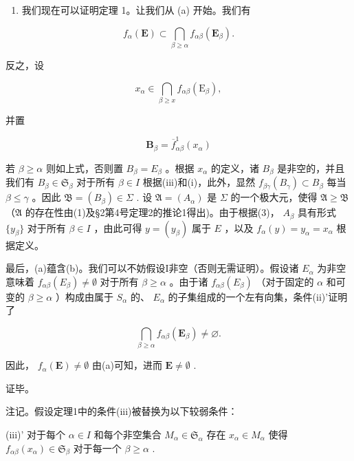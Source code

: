 \begin{enumerate}
\def\labelenumi{(\arabic{enumi})}
\setcounter{enumi}{3}
\tightlist
\item
  我们现在可以证明定理 1。让我们从 (a) 开始。我们有
\end{enumerate}

\[
f _ {\alpha} (\mathbf {E}) \subset \bigcap_ {\beta \geqslant \alpha} f _ {\alpha \beta} (\mathbf {E} _ {\beta}).
\]

反之，设

\[
x _ {\alpha} \in \bigcap_ {\beta \geqslant x} f _ {\alpha \beta} (\mathrm{E} _ {\beta}),
\]

并置

\[
\mathbf {B} _ {\beta} = \overline {{f}} _ {\alpha \beta} ^ {1} (x _ {\alpha})
\]

若 \(\beta \geqslant \alpha\) 则如上式，否则置 \(B_{\beta} = E_{\beta}\) 。根据 \(x_{\alpha}\) 的定义，诸 \(B_{\beta}\) 是非空的，并且我们有 \(B_{\beta} \in \mathfrak{S}_{\beta}\) 对于所有 \(\beta \in I\) 根据(iii)和(i)，此外，显然 \(f_{\beta \gamma}(B_{\gamma}) \subset B_{\beta}\) 每当 \(\beta \leqslant \gamma\) 。因此 \(\mathfrak{B} = (B_{\beta}) \in \Sigma\) . 设 \(\mathfrak{A} = (A_{\alpha})\) 是 \(\Sigma\) 的一个极大元，使得 \(\mathfrak{A} \geqslant \mathfrak{B}\) （\(\mathfrak{A}\) 的存在性由(1)及§2第4号定理2的推论1得出)。由于根据(3)， \(A_{\beta}\) 具有形式 \(\{y_{\beta}\}\) 对于所有 \(\beta \in I\) ，由此可得 \(y = (y_{\beta})\) 属于 \(E\) ，以及 \(f_{\alpha}(y) = y_{\alpha} = x_{\alpha}\) 根据定义。

最后，(a)蕴含(b)。我们可以不妨假设I非空（否则无需证明）。假设诸 \(E_{\alpha}\) 为非空意味着 \(f_{\alpha\beta}(E_{\beta}) \neq \emptyset\) 对于所有 \(\beta \geqslant \alpha\) 。由于诸 \(f_{\alpha\beta}(E_{\beta})\) （对于固定的 \(\alpha\) 和可变的 \(\beta \geqslant \alpha\) ）构成由属于 \(S_{\alpha}\) 的、 \(E_{\alpha}\) 的子集组成的一个左有向集，条件(ii)'证明了

\[
\bigcap_ {\beta \geqslant \alpha} f _ {\alpha \beta} (\mathbf {E} _ {\beta}) \neq \varnothing .
\]

因此， \(f_{\alpha}(\mathbf{E}) \neq \emptyset\) 由(a)可知，进而 \(\mathbf{E} \neq \emptyset\) .

证毕。

注记。假设定理1中的条件(iii)被替换为以下较弱条件：

(iii)' 对于每个 \(\alpha \in I\) 和每个非空集合 \(M_{\alpha} \in \mathfrak{S}_{\alpha}\) 存在 \(x_{\alpha} \in M_{\alpha}\) 使得 \(f_{\alpha \beta}(x_{\alpha}) \in \mathfrak{S}_{\beta}\) 对于每一个 \(\beta \geqslant \alpha\) .

